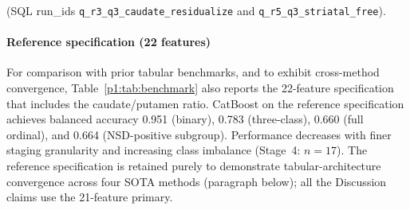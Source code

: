 \documentclass[10pt,letterpaper]{article}
\begin{document}
(SQL run\_ids \texttt{q\_r3\_q3\_caudate\_residualize} and \texttt{q\_r5\_q3\_striatal\_free}).

\paragraph*{Reference specification (22 features)} For comparison with prior tabular benchmarks, and to exhibit cross-method convergence, Table~\ref{p1:tab:benchmark} also reports the 22-feature specification that includes the caudate/putamen ratio. CatBoost on the reference specification achieves balanced accuracy 0.951 (binary), 0.783 (three-class), 0.660 (full ordinal), and 0.664 (NSD-positive subgroup). Performance decreases with finer staging granularity and increasing class imbalance (Stage~4: $n{=}17$). The reference specification is retained purely to demonstrate tabular-architecture convergence across four SOTA methods (paragraph below); all the Discussion claims use the 21-feature primary.
\end{document}

